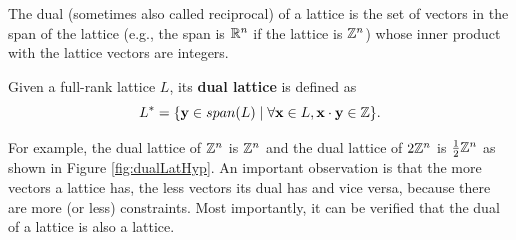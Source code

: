 \documentclass[../main.tex]{subfiles}
\begin{document}
The dual (sometimes also called reciprocal) of a lattice is the set of vectors in the span of the lattice (e.g., the span is $\mathbb{R}^n$ if the lattice is $\mathbb{Z}^n$) whose inner product with the lattice vectors are integers.

\begin{definition}
\reversemarginpar
{}
Given a full-rank lattice $L$, its \textbf{dual lattice}  is defined as 
\begin{equation*}
    L^* = \{\mathbf{y} \in span(L) \mid \forall \mathbf{x} \in L, \mathbf{x} \cdot \mathbf{y} \in \mathbb{Z}\}.
\end{equation*}
\end{definition}
For example, the dual lattice of $\mathbb{Z}^n$ is $\mathbb{Z}^n$ and the dual lattice of $2\mathbb{Z}^n$ is $\frac{1}{2}\mathbb{Z}^n$ as shown in Figure \ref{fig:dualLatHyp}. An important observation is that the more vectors a lattice has, the less vectors its dual has and vice versa, because there are more (or less) constraints. Most importantly, it can be verified that the dual of a lattice is also a lattice.
\end{document}
